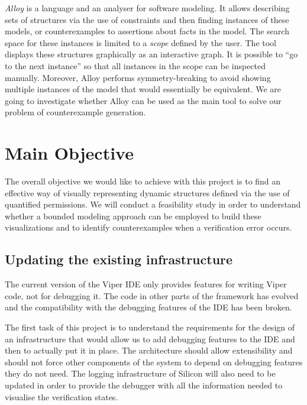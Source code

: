 \emph{Alloy} \citep{alloy_web, software-abstractions} is a language and an
analyser for software modeling. It allows describing sets of structures via the
use of constraints and then finding instances of these models, or
counterexamples to assertions about facts in the model. The search space for
these instances is limited to a \emph{scope} defined by the user. The tool
displays these structures graphically as an interactive graph. It is possible to
``go to the next instance'' so that all instances in the scope can be inspected
manually. Moreover, Alloy performs symmetry-breaking to avoid showing multiple
instances of the model that would essentially be equivalent. We are going to
investigate whether Alloy can be used as the main tool to solve our problem of
counterexample generation.


\section{Main Objective}

The overall objective we would like to achieve with this project is to find an
effective way of visually representing dynamic structures defined via the use of
quantified permissions. We will conduct a feasibility study in order to
understand whether a bounded modeling approach can be employed to build these
visualizations and to identify counterexamples when a verification error occurs.

\subsection{Updating the existing infrastructure}\label{updating-the-existing-infrastructure}

The current version of the Viper IDE only provides features for
writing Viper code, not for debugging it. The code in other parts of the
framework has evolved and the compatibility with the debugging features
of the IDE has been broken.

The first task of this project is to understand the requirements for the design of
an infrastructure that would allow us to add debugging features to the IDE and
then to actually put it in place. The architecture should allow extensibility
and should not force other components of the system to depend on debugging
features they do not need. The logging infrastructure of Silicon will also need
to be updated in order to provide the debugger with all the information needed
to visualise the verification states.

